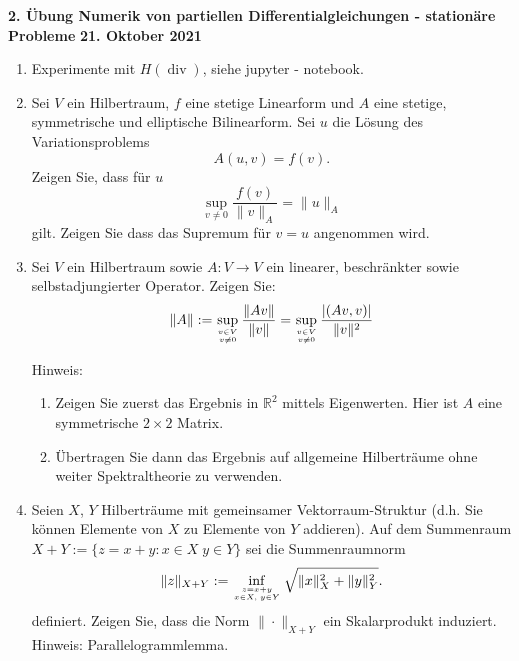\documentclass[11pt,a4paper]{report}
\newcommand{\setR}{\mathbb{R}}
\begin{document}
\begin{center}
\textbf{2. \"Ubung Numerik von partiellen Differentialgleichungen - station\"are Probleme} \newline 
\textbf{21. Oktober 2021}
\end{center}

\setcounter{enumi}{4}

\begin{enumerate}

\item Experimente mit $H(\operatorname{div})$, siehe jupyter - notebook.

\item Sei $V$ ein Hilbertraum, $f$ eine stetige Linearform und $A$ eine stetige, symmetrische und elliptische Bilinearform. Sei $u$ die L\"osung des Variationsproblems
$$A(u,v) = f(v).$$
Zeigen Sie, dass f\"ur $u$
$$\sup\limits_{v\neq 0} \frac{f(v)}{\|v\|_A} = \|u\|_A$$
gilt. Zeigen Sie dass das Supremum f\"ur $v=u$ angenommen wird.
\vspace{15pt}



\item Sei $V$ ein Hilbertraum sowie $A: V \rightarrow V$ ein linearer,
  beschr\"ankter sowie selbstadjungierter Operator. Zeigen Sie:\\
$$ \| A\| := \sup\limits_{v \in V \atop v\neq 0} \frac{\|Av \|}{\| v
  \|} = \sup\limits_{v\in V\atop v\neq 0} \frac{|(Av,v)|}{\|v\|^2}$$

Hinweis:
\begin{enumerate}
\item
  Zeigen Sie zuerst das Ergebnis in $\setR^2$ mittels
  Eigenwerten. Hier ist $A$ eine symmetrische $2 \times 2$ Matrix.
\item
  \"Ubertragen Sie dann das Ergebnis auf allgemeine Hilbertr\"aume
  ohne weiter Spektraltheorie zu verwenden.
\end{enumerate}

\vspace{15pt}





\item Seien $X$, $Y$ Hilbertr\"aume mit gemeinsamer
  Vektorraum-Struktur (d.h. Sie k\"onnen Elemente von $X$ zu Elemente
  von $Y$ addieren). Auf  dem Summenraum $X+Y:= \{z = x+ y: x\in
  X\;y\in Y \}$ sei die Summenraumnorm
$$\| z\|_{X+Y}:= \inf\limits_{z=x+y \atop x\in X,\; y\in Y} \sqrt{\|x\|_X^2 +\|y\|_Y^2}.$$
definiert. Zeigen Sie, dass die Norm $\|\cdot \|_{X+Y}$ ein Skalarprodukt
induziert. Hinweis: Parallelogrammlemma.
\vspace{15pt}



\end{enumerate}
\end{document}
